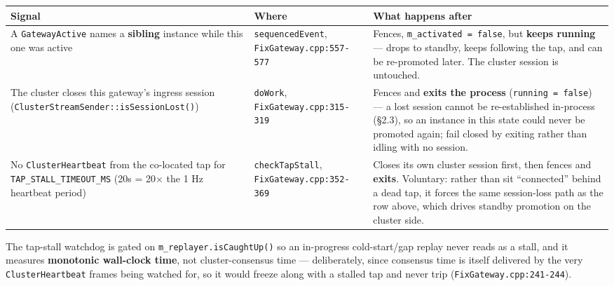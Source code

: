 \documentclass[
  10pt,
]{article}
\newcounter{none} %
\begin{document}
{\def\LTcaptype{none} %
\begin{longtable}[]{@{}
  >{\raggedright\arraybackslash}p{}
  >{\raggedright\arraybackslash}p{}
  >{\raggedright\arraybackslash}p{}@{}}
\toprule\noalign{}
\begin{minipage}[b]{\linewidth}\raggedright
Signal
\end{minipage} & \begin{minipage}[b]{\linewidth}\raggedright
Where
\end{minipage} & \begin{minipage}[b]{\linewidth}\raggedright
What happens after
\end{minipage} \\
\midrule\noalign{}
\endhead
\bottomrule\noalign{}
\endlastfoot
A \texttt{GatewayActive} names a \textbf{sibling} instance while this
one was active & \texttt{sequencedEvent},
\texttt{FixGateway.cpp:557-577} & Fences,
\texttt{m\_activated\ =\ false}, but \textbf{keeps running} --- drops to
standby, keeps following the tap, and can be re-promoted later. The
cluster session is untouched. \\
The cluster closes this gateway's ingress session
(\texttt{ClusterStreamSender::isSessionLost()}) & \texttt{doWork},
\texttt{FixGateway.cpp:315-319} & Fences and \textbf{exits the process}
(\texttt{running\ =\ false}) --- a lost session cannot be re-established
in-process (§2.3), so an instance in this state could never be promoted
again; fail closed by exiting rather than idling with no session. \\
No \texttt{ClusterHeartbeat} from the co-located tap for
\texttt{TAP\_STALL\_TIMEOUT\_MS} (20s = 20× the 1 Hz heartbeat period) &
\texttt{checkTapStall}, \texttt{FixGateway.cpp:352-369} & Closes its own
cluster session first, then fences and \textbf{exits}. Voluntary: rather
than sit ``connected'' behind a dead tap, it forces the same
session-loss path as the row above, which drives standby promotion on
the cluster side. \\
\end{longtable}
}

The tap-stall watchdog is gated on \texttt{m\_replayer.isCaughtUp()} so
an in-progress cold-start/gap replay never reads as a stall, and it
measures \textbf{monotonic wall-clock time}, not cluster-consensus time
--- deliberately, since consensus time is itself delivered by the very
\texttt{ClusterHeartbeat} frames being watched for, so it would freeze along with a
stalled tap and never trip (\texttt{FixGateway.cpp:241-244}).
\end{document}

